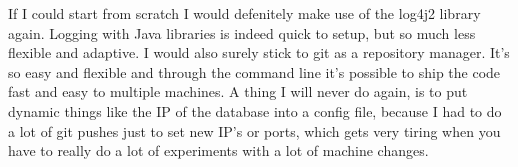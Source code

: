 \documentclass[11pt]{article}
\begin{document}
If I could start from scratch I would defenitely make use of the log4j2 library again. Logging with Java libraries is indeed quick to setup, but so much less flexible and adaptive. I would also surely stick to git as a repository manager. It's so easy and flexible and through the command line it's possible to ship the code fast and easy to multiple machines. A thing I will never do again, is to put dynamic things like the IP of the database into a config file, because I had to do a lot of git pushes just to set new IP's or ports, which gets very tiring when you have to really do a lot of experiments with a lot of machine changes.
\end{document}
